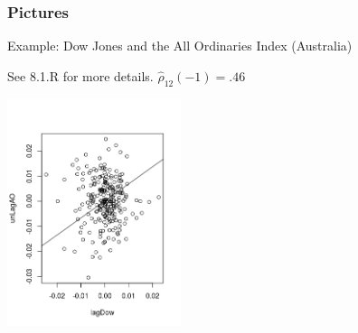 \documentclass{beamer}
\begin{document}

\begin{frame}[fragile]
\frametitle{Pictures}

Example: Dow Jones and the All Ordinaries Index (Australia)
\newline

See 8.1.R for more details. $\hat{\rho}_{12}(-1) = .46$


\begin{center}
\includegraphics[width=2.00in]{./pics/Rplot04}
\end{center}

\end{frame}
\end{document}

